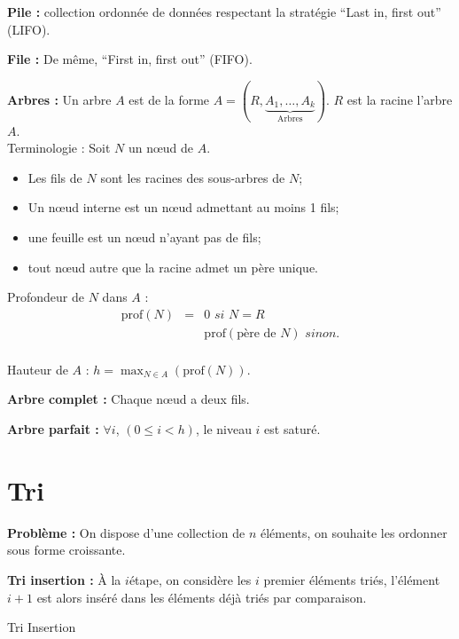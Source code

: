 \documentclass[a4paper, 8pt]{article}
\begin{document}
\begin{multicols*}{3}
\textbf{Pile :} collection ordonnée de données respectant la stratégie \enquote{Last in, first out} (LIFO).

\textbf{File :} De même, \enquote{First in, first out} (FIFO).

\textbf{Arbres :} Un arbre $A$ est de la forme $A = (R, \underbrace{A_1, \ldots, A_k}_{\text{Arbres}})$. $R$ est la racine l'arbre $A$.\\
Terminologie : Soit $N$ un nœud de $A$.
\begin{itemize}
\item Les fils de $N$ sont les racines des sous-arbres de $N$;
\item Un nœud interne est un nœud admettant au moins 1 fils;
\item une feuille est un nœud n'ayant pas de fils;
\item tout nœud autre que la racine admet un père unique.
\end{itemize}

Profondeur de $N$ dans $A$ :
\[
\begin{array}{rc|l}
\text{prof}(N) & = & 0 \textit{ si } N=R  \\
 & & \text{prof}(\text{père de }N) \textit{ sinon.}  \\
\end{array}
\]

Hauteur de $A$ : $h = \displaystyle \max_{N\in A}\left(\text{prof}(N)\right).$

\textbf{Arbre complet :} Chaque nœud a deux fils.

\textbf{Arbre parfait :} $\forall i$, $(0 \leqslant i < h)$, le niveau $i$ est saturé.

\section*{Tri}

\newcommand{\GO}{\mathcal{O}}

\textbf{Problème :} On dispose d'une collection de $n$ éléments, on souhaite les ordonner sous forme croissante.

\textbf{Tri insertion :} \`{A} la $i$\ieme étape, on considère les $i$ premier éléments triés, l'élément $i+1$ est alors inséré dans les éléments déjà triés par comparaison.
\begin{algorithm}[H]
 \caption{Tri Insertion}
\end{algorithm}


\end{multicols*}
\end{document}
